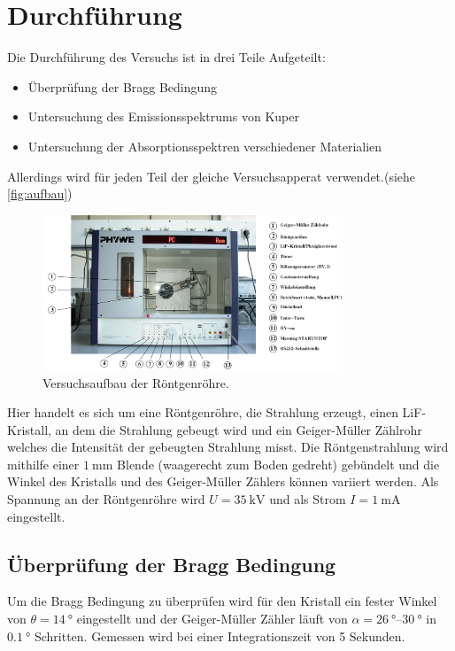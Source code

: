 \section{Durchführung}
\label{sec:Durchführung}

Die Durchführung des Versuchs ist in drei Teile Aufgeteilt:
\begin{itemize}
    \item Überprüfung der Bragg Bedingung
    \item Untersuchung des Emissionsspektrums von Kuper
    \item Untersuchung der Absorptionsspektren verschiedener Materialien
\end{itemize}
Allerdings wird für jeden Teil der gleiche Versuchsapperat verwendet.(siehe \autoref{fig:aufbau})

\begin{figure}
    \centering
    \includegraphics[width=0.8\textwidth]{images/aufbau.png}
    \caption{Versuchsaufbau der Röntgenröhre.}
    \label{fig:aufbau}
\end{figure}

Hier handelt es sich um eine Röntgenröhre, die Strahlung erzeugt, einen LiF-Kristall, an dem die Strahlung gebeugt wird und ein Geiger-Müller Zählrohr welches die Intensität der gebeugten Strahlung misst.
Die Röntgenstrahlung wird mithilfe einer $\SI{1}{\milli\metre}$ Blende (waagerecht zum Boden gedreht) gebündelt und die Winkel des Kristalls und des Geiger-Müller Zählers können variiert werden.
Als Spannung an der Röntgenröhre wird $U=\SI{35}{\kilo\volt}$ und als Strom $I=\SI{1}{\milli\ampere}$ eingestellt.


\subsection{Überprüfung der Bragg Bedingung}
\label{ssec:bragg}

Um die Bragg Bedingung zu überprüfen wird für den Kristall ein fester Winkel von $\theta=\SI{14}{\degree}$ eingestellt und der Geiger-Müller Zähler läuft von $\alpha=\SIrange{26}{30}{\degree}$ in $\SI{0.1}{\degree}$ Schritten.
Gemessen wird bei einer Integrationszeit von 5 Sekunden.

